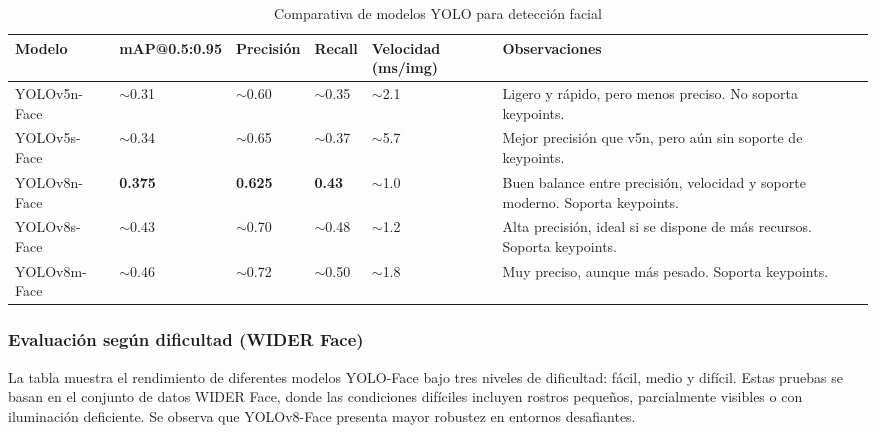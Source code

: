 \begin{table}[H]
    \centering
    \caption{Comparativa de modelos YOLO para detección facial}
    \label{tab:comparativa_yolo}
    \renewcommand{\arraystretch}{1.3}
    \scriptsize
    \begin{tabular}{|p{3cm}|p{2.3cm}|p{1.3cm}|p{1.3cm}|p{1.3cm}|p{4.5cm}|}
        \hline
        \textbf{Modelo} & \textbf{mAP@0.5:0.95} & \textbf{Precisión} & \textbf{Recall} & \textbf{Velocidad (ms/img)} & \textbf{Observaciones} \\
        \hline
        YOLOv5n-Face & $\sim$0.31 & $\sim$0.60 & $\sim$0.35 & $\sim$2.1 & Ligero y rápido, pero menos preciso. No soporta keypoints. \\
        \hline
        YOLOv5s-Face & $\sim$0.34 & $\sim$0.65 & $\sim$0.37 & $\sim$5.7 & Mejor precisión que v5n, pero aún sin soporte de keypoints. \\
        \hline
        YOLOv8n-Face & \textbf{0.375} & \textbf{0.625} & \textbf{0.43} & $\sim$1.0 & Buen balance entre precisión, velocidad y soporte moderno. Soporta keypoints. \\
        \hline
        YOLOv8s-Face & $\sim$0.43 & $\sim$0.70 & $\sim$0.48 & $\sim$1.2 & Alta precisión, ideal si se dispone de más recursos. Soporta keypoints. \\
        \hline
        YOLOv8m-Face & $\sim$0.46 & $\sim$0.72 & $\sim$0.50 & $\sim$1.8 & Muy preciso, aunque más pesado. Soporta keypoints. \\
        \hline
    \end{tabular}
\end{table}



\subsubsection*{Evaluación según dificultad (WIDER Face)}

La tabla muestra el rendimiento de diferentes modelos YOLO-Face bajo tres niveles de dificultad: fácil, medio y difícil. Estas pruebas se basan en el conjunto de datos WIDER Face, donde las condiciones difíciles incluyen rostros pequeños, parcialmente visibles o con iluminación deficiente. Se observa que YOLOv8-Face presenta mayor robustez en entornos desafiantes.

